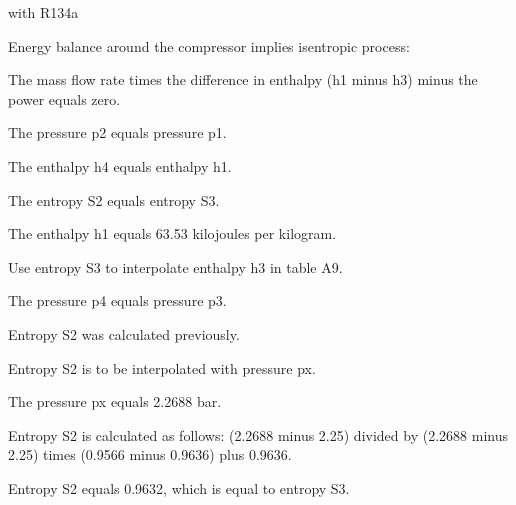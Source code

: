 with R134a

Energy balance around the compressor implies isentropic process:

The mass flow rate times the difference in enthalpy (h1 minus h3) minus the power equals zero.

The pressure p2 equals pressure p1.

The enthalpy h4 equals enthalpy h1.

The entropy S2 equals entropy S3.

The enthalpy h1 equals 63.53 kilojoules per kilogram.

Use entropy S3 to interpolate enthalpy h3 in table A9.

The pressure p4 equals pressure p3.

Entropy S2 was calculated previously.

Entropy S2 is to be interpolated with pressure px.

The pressure px equals 2.2688 bar.

Entropy S2 is calculated as follows: (2.2688 minus 2.25) divided by (2.2688 minus 2.25) times (0.9566 minus 0.9636) plus 0.9636.

Entropy S2 equals 0.9632, which is equal to entropy S3.